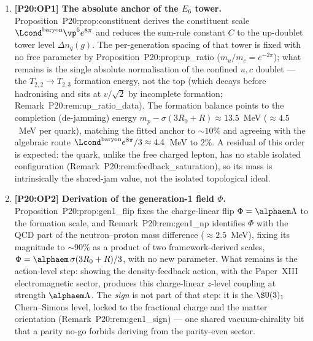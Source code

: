 \begin{enumerate}[label=,leftmargin=*]
\item \textbf{[P20:OP1] The absolute anchor of the $E_6$ tower.}
Proposition~P20:prop:constituent derives the constituent scale
$\Lcond^{\rm baryon}\vp^6 e^{8\pi}$ and reduces the sum-rule constant $C$
to the up-doublet tower level $\Delta n_q(g)$. The per-generation spacing
of that tower is fixed with no free parameter by
Proposition~P20:prop:up\_ratio ($m_u/m_c=e^{-2\pi}$); what remains is the
single absolute normalisation of the confined $u,c$ doublet --- the
$T_{2,2}\to T_{2,3}$ formation energy, not the top (which decays before
hadronising and sits at $v/\sqrt2$ by incomplete formation;
Remark~P20:rem:up\_ratio\_data). The formation balance points to the
completion (de-jamming) energy $m_p-\sigma(3R_0+R)\approx13.5$~MeV
($\approx4.5$~MeV per quark), matching the fitted anchor to $\sim10\%$
and agreeing with the algebraic route
$\Lcond^{\rm baryon}e^{8\pi}/3\approx4.4$~MeV to $2\%$. A residual of this
order is expected: the quark, unlike the free charged lepton, has no
stable isolated configuration (Remark~P20:rem:feedback\_saturation), so
its mass is intrinsically the shared-jam value, not the isolated
topological ideal.

\item \textbf{[P20:OP2] Derivation of the generation-1 field $\Phi$.}
Proposition~P20:prop:gen1\_flip fixes the charge-linear flip
$\Phi=\alphaem\Lambda$ to the formation scale, and
Remark~P20:rem:gen1\_np identifies $\Phi$ with the QCD part of the
neutron--proton mass difference ($\approx2.5$~MeV), fixing its magnitude
to $\sim90\%$ as a product of two framework-derived scales,
$\Phi=\alphaem\,\sigma(3R_0+R)/3$, with no new parameter. What remains is
the action-level step: showing the density-feedback action, with the
Paper~XIII electromagnetic sector, produces this charge-linear
$z$-level coupling at strength $\alphaem\Lambda$. The \emph{sign} is not
part of that step: it is the $\SU(3)_1$ Chern--Simons level, locked to
the fractional charge and the matter orientation
(Remark~P20:rem:gen1\_sign) --- one shared vacuum-chirality bit that a
parity no-go forbids deriving from the parity-even sector.


\end{enumerate}

